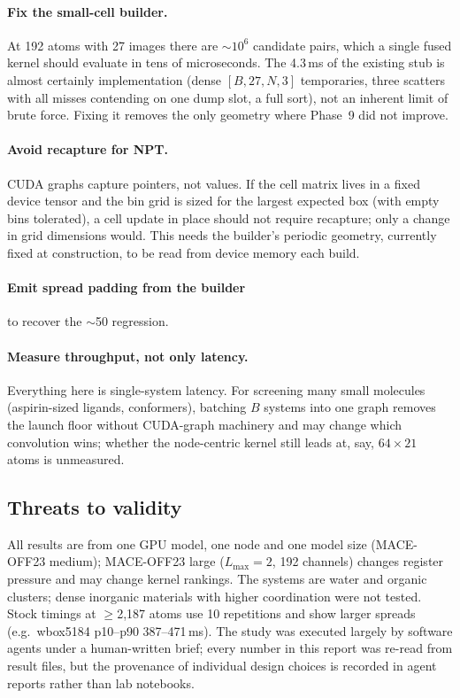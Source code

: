 \paragraph{Fix the small-cell builder.} At 192 atoms with 27 images there are $\sim10^6$ candidate pairs, which a single fused kernel should evaluate in tens of microseconds. The 4.3\,ms of the existing stub is almost certainly implementation (dense $[B,27,N,3]$ temporaries, three scatters with all misses contending on one dump slot, a full sort), not an inherent limit of brute force. Fixing it removes the only geometry where Phase~9 did not improve.
\paragraph{Avoid recapture for NPT.} CUDA graphs capture pointers, not values. If the cell matrix lives in a fixed device tensor and the bin grid is sized for the largest expected box (with empty bins tolerated), a cell update in place should not require recapture; only a change in grid dimensions would. This needs the builder's periodic geometry, currently fixed at construction, to be read from device memory each build.
\paragraph{Emit spread padding from the builder} to recover the $\sim$50\us{} \Bone{} regression.
\paragraph{Measure throughput, not only latency.} Everything here is single-system latency. For screening many small molecules (aspirin-sized ligands, conformers), batching $B$ systems into one graph removes the launch floor without CUDA-graph machinery and may change which convolution wins; whether the node-centric kernel still leads at, say, $64\times21$ atoms is unmeasured.

\subsection{Threats to validity}
All results are from one GPU model, one node and one model size (MACE-OFF23 medium); MACE-OFF23 large ($L_{\max}=2$, 192 channels) changes register pressure and may change kernel rankings. The systems are water and organic clusters; dense inorganic materials with higher coordination were not tested. Stock timings at $\ge$2{,}187 atoms use 10 repetitions and show larger spreads (e.g.\ wbox5184 \Btwo{} p10--p90 387--471\,ms). The study was executed largely by software agents under a human-written brief; every number in this report was re-read from result files, but the provenance of individual design choices is recorded in agent reports rather than lab notebooks.
